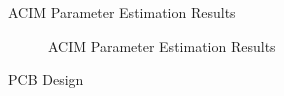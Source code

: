 \begin{frame}{ACIM Parameter Estimation Results}
	\begin{figure}
		\centering


		\caption{ACIM Parameter Estimation Results}
	\end{figure}
\end{frame}





\begin{frame}{PCB Design}
	\begin{figure}
		\centering


	\end{figure}
\end{frame}



